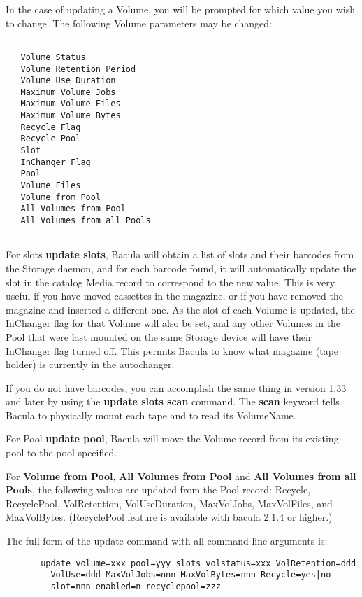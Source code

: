 \begin{description}
In the case of updating a  Volume, you will be prompted for which value you
wish to change.  The following Volume parameters may be changed:  

\footnotesize
\begin{verbatim}
 
   Volume Status
   Volume Retention Period
   Volume Use Duration
   Maximum Volume Jobs
   Maximum Volume Files
   Maximum Volume Bytes
   Recycle Flag
   Recycle Pool
   Slot
   InChanger Flag
   Pool
   Volume Files
   Volume from Pool
   All Volumes from Pool
   All Volumes from all Pools
   
\end{verbatim}
\normalsize

   For slots {\bf update slots}, Bacula will obtain a list of slots and
   their barcodes from the Storage daemon, and for each barcode found, it
   will automatically update the slot in the catalog Media record to
   correspond to the new value.  This is very useful if you have moved
   cassettes in the magazine, or if you have removed the magazine and
   inserted a different one.  As the slot of each Volume is updated, the
   InChanger flag for that Volume will also be set, and any other Volumes
   in the Pool that were last mounted on the same Storage device
   will have their InChanger flag turned off.  This permits
   Bacula to know what magazine (tape holder) is currently in the
   autochanger.

   If you do not have barcodes, you can accomplish the same thing in
   version 1.33 and later by using the {\bf update slots scan} command.
   The {\bf scan} keyword tells Bacula to physically mount each tape and to
   read its VolumeName.

   For Pool {\bf update pool}, Bacula will move the Volume record from its
   existing pool to the pool specified.

   For {\bf Volume from Pool}, {\bf All Volumes from Pool} and {\bf All Volumes
     from all Pools}, the following values are updated from the Pool record:
   Recycle, RecyclePool, VolRetention, VolUseDuration, MaxVolJobs, MaxVolFiles,
   and MaxVolBytes.  (RecyclePool feature is available with bacula 2.1.4 or
   higher.)

   The full form of the update command with all command line arguments is:

\footnotesize
\begin{verbatim}
       update volume=xxx pool=yyy slots volstatus=xxx VolRetention=ddd
         VolUse=ddd MaxVolJobs=nnn MaxVolBytes=nnn Recycle=yes|no
         slot=nnn enabled=n recyclepool=zzz
      

\end{verbatim}
\end{description}
